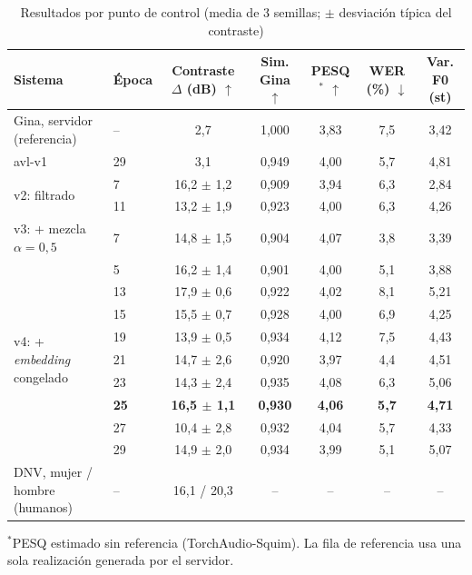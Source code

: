 \documentclass[conference]{IEEEtran}
\begin{document}
\begin{table}[t]
\centering
\caption{Resultados por punto de control (media de 3 semillas; $\pm$ desviación típica del contraste)}
\label{tab:resultados}
\begin{tabular}{@{}llccccc@{}}
\toprule
Sistema & Época & Contraste $\Delta$ (dB) $\uparrow$ & Sim. Gina $\uparrow$ & PESQ$^{*}$ $\uparrow$ & WER (\%) $\downarrow$ & Var. F0 (st) \\
\midrule
Gina, servidor (referencia) & -- & 2,7 & 1,000 & 3,83 & 7,5 & 3,42 \\
avl-v1 & 29 & 3,1 & 0,949 & 4,00 & 5,7 & 4,81 \\
\midrule
\multirow{2}{*}{v2: filtrado} & 7 & 16,2 $\pm$ 1,2 & 0,909 & 3,94 & 6,3 & 2,84 \\
 & 11 & 13,2 $\pm$ 1,9 & 0,923 & 4,00 & 6,3 & 4,26 \\
\midrule
v3: + mezcla $\alpha{=}0{,}5$ & 7 & 14,8 $\pm$ 1,5 & 0,904 & 4,07 & 3,8 & 3,39 \\
\midrule
\multirow{9}{*}{v4: + \textit{embedding} congelado} & 5 & 16,2 $\pm$ 1,4 & 0,901 & 4,00 & 5,1 & 3,88 \\
 & 13 & 17,9 $\pm$ 0,6 & 0,922 & 4,02 & 8,1 & 5,21 \\
 & 15 & 15,5 $\pm$ 0,7 & 0,928 & 4,00 & 6,9 & 4,25 \\
 & 19 & 13,9 $\pm$ 0,5 & 0,934 & 4,12 & 7,5 & 4,43 \\
 & 21 & 14,7 $\pm$ 2,6 & 0,920 & 3,97 & 4,4 & 4,51 \\
 & 23 & 14,3 $\pm$ 2,4 & 0,935 & 4,08 & 6,3 & 5,06 \\
 & \textbf{25} & \textbf{16,5 $\pm$ 1,1} & \textbf{0,930} & \textbf{4,06} & \textbf{5,7} & \textbf{4,71} \\
 & 27 & 10,4 $\pm$ 2,8 & 0,932 & 4,04 & 5,7 & 4,33 \\
 & 29 & 14,9 $\pm$ 2,0 & 0,934 & 3,99 & 5,1 & 5,07 \\
\midrule
DNV, mujer / hombre (humanos) & -- & 16,1 / 20,3 & -- & -- & -- & -- \\
\bottomrule
\end{tabular}
\vspace{2pt}

{\footnotesize $^{*}$PESQ estimado sin referencia (TorchAudio-Squim). La fila de referencia usa una sola realización generada por el servidor.}
\end{table}
\end{document}
